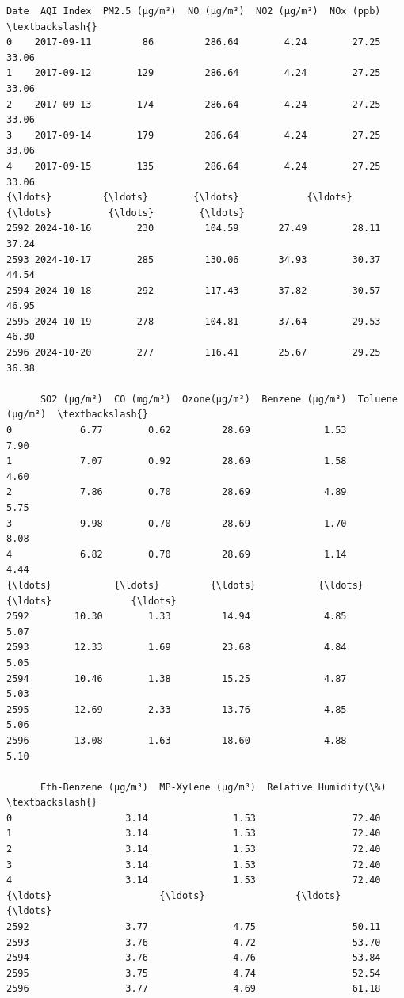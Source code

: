 \documentclass[11pt]{article}
\makeatletter
\newcommand{\boxspacing}{\kern\kvtcb@left@rule\kern\kvtcb@boxsep}
\newcommand{\prompt}[4]{
        {\ttfamily\llap{{\color{#2}[#3]:\hspace{3pt}#4}}\vspace{-\baselineskip}}
    }
\makeatother
\begin{document}
            \begin{tcolorbox}[breakable, size=fbox, boxrule=.5pt, pad at break*=1mm, opacityfill=0]
\prompt{Out}{outcolor}{31}{\boxspacing}
\begin{Verbatim}[commandchars=\\\{\}]
           Date  AQI Index  PM2.5 (µg/m³)  NO (µg/m³)  NO2 (µg/m³)  NOx (ppb)  \textbackslash{}
0    2017-09-11         86         286.64        4.24        27.25      33.06
1    2017-09-12        129         286.64        4.24        27.25      33.06
2    2017-09-13        174         286.64        4.24        27.25      33.06
3    2017-09-14        179         286.64        4.24        27.25      33.06
4    2017-09-15        135         286.64        4.24        27.25      33.06
{\ldots}         {\ldots}        {\ldots}            {\ldots}         {\ldots}          {\ldots}        {\ldots}
2592 2024-10-16        230         104.59       27.49        28.11      37.24
2593 2024-10-17        285         130.06       34.93        30.37      44.54
2594 2024-10-18        292         117.43       37.82        30.57      46.95
2595 2024-10-19        278         104.81       37.64        29.53      46.30
2596 2024-10-20        277         116.41       25.67        29.25      36.38

      SO2 (µg/m³)  CO (mg/m³)  Ozone(µg/m³)  Benzene (µg/m³)  Toluene (µg/m³)  \textbackslash{}
0            6.77        0.62         28.69             1.53             7.90
1            7.07        0.92         28.69             1.58             4.60
2            7.86        0.70         28.69             4.89             5.75
3            9.98        0.70         28.69             1.70             8.08
4            6.82        0.70         28.69             1.14             4.44
{\ldots}           {\ldots}         {\ldots}           {\ldots}              {\ldots}              {\ldots}
2592        10.30        1.33         14.94             4.85             5.07
2593        12.33        1.69         23.68             4.84             5.05
2594        10.46        1.38         15.25             4.87             5.03
2595        12.69        2.33         13.76             4.85             5.06
2596        13.08        1.63         18.60             4.88             5.10

      Eth-Benzene (µg/m³)  MP-Xylene (µg/m³)  Relative Humidity(\%)  \textbackslash{}
0                    3.14               1.53                 72.40
1                    3.14               1.53                 72.40
2                    3.14               1.53                 72.40
3                    3.14               1.53                 72.40
4                    3.14               1.53                 72.40
{\ldots}                   {\ldots}                {\ldots}                   {\ldots}
2592                 3.77               4.75                 50.11
2593                 3.76               4.72                 53.70
2594                 3.76               4.76                 53.84
2595                 3.75               4.74                 52.54
2596                 3.77               4.69                 61.18


\end{Verbatim}
\end{tcolorbox}
\end{document}
